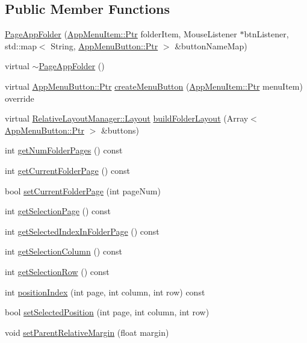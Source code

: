 \subsection*{Public Member Functions}
\begin{DoxyCompactItemize}
\item 
\mbox{\hyperlink{classPageAppFolder_a0c5e4015a885b703f251e0379d6ec9b4}{Page\+App\+Folder}} (\mbox{\hyperlink{classAppMenuItem_ab5f51c5d74f8df62b8862c0cc8126cb7}{App\+Menu\+Item\+::\+Ptr}} folder\+Item, Mouse\+Listener $\ast$btn\+Listener, std\+::map$<$ String, \mbox{\hyperlink{classAppMenuButton_aeb692efb6a933970de8eac14e5e71544}{App\+Menu\+Button\+::\+Ptr}} $>$ \&button\+Name\+Map)
\item 
virtual \mbox{\hyperlink{classPageAppFolder_ac13fb86b1e0b8bb8109ea9fbe979253b}{$\sim$\+Page\+App\+Folder}} ()
\item 
virtual \mbox{\hyperlink{classAppMenuButton_aeb692efb6a933970de8eac14e5e71544}{App\+Menu\+Button\+::\+Ptr}} \mbox{\hyperlink{classPageAppFolder_a1f26a965194bf0e14503823971f21ec4}{create\+Menu\+Button}} (\mbox{\hyperlink{classAppMenuItem_ab5f51c5d74f8df62b8862c0cc8126cb7}{App\+Menu\+Item\+::\+Ptr}} menu\+Item) override
\item 
virtual \mbox{\hyperlink{classRelativeLayoutManager_a3dcd4cd0bc41754f3b4a64bc29b5eca5}{Relative\+Layout\+Manager\+::\+Layout}} \mbox{\hyperlink{classPageAppFolder_a24e2bcf990a45c7c45ee1bf04140d46b}{build\+Folder\+Layout}} (Array$<$ \mbox{\hyperlink{classAppMenuButton_aeb692efb6a933970de8eac14e5e71544}{App\+Menu\+Button\+::\+Ptr}} $>$ \&buttons)
\item 
int \mbox{\hyperlink{classPageAppFolder_a5f18f8c254b9cca63770b93bf881a9a4}{get\+Num\+Folder\+Pages}} () const
\item 
int \mbox{\hyperlink{classPageAppFolder_a1ef76fbc32e943614313b30708ae8dac}{get\+Current\+Folder\+Page}} () const
\item 
bool \mbox{\hyperlink{classPageAppFolder_a0e5433a11571b599ec279f7a4ca9ee39}{set\+Current\+Folder\+Page}} (int page\+Num)
\item 
int \mbox{\hyperlink{classPageAppFolder_a12d9149b5502f2bef56542f65a298964}{get\+Selection\+Page}} () const
\item 
int \mbox{\hyperlink{classPageAppFolder_a1c59f6ee22e0ba08d47a8e5e9a9a29de}{get\+Selected\+Index\+In\+Folder\+Page}} () const
\item 
int \mbox{\hyperlink{classPageAppFolder_ae70550dbace1ea8619b8a3b02a9896e9}{get\+Selection\+Column}} () const
\item 
int \mbox{\hyperlink{classPageAppFolder_a5d2e4c1c9a389824e03ea658adad2c57}{get\+Selection\+Row}} () const
\item 
int \mbox{\hyperlink{classPageAppFolder_a90b3428fc2ebfb34759ca3d1e63ab530}{position\+Index}} (int page, int column, int row) const
\item 
bool \mbox{\hyperlink{classPageAppFolder_a81ecc480e6b29644cc0c39f397df21d5}{set\+Selected\+Position}} (int page, int column, int row)
\item 
void \mbox{\hyperlink{classPageAppFolder_a4393f5fc5b77a2c901285f4a111357b1}{set\+Parent\+Relative\+Margin}} (float margin)
\end{DoxyCompactItemize}
